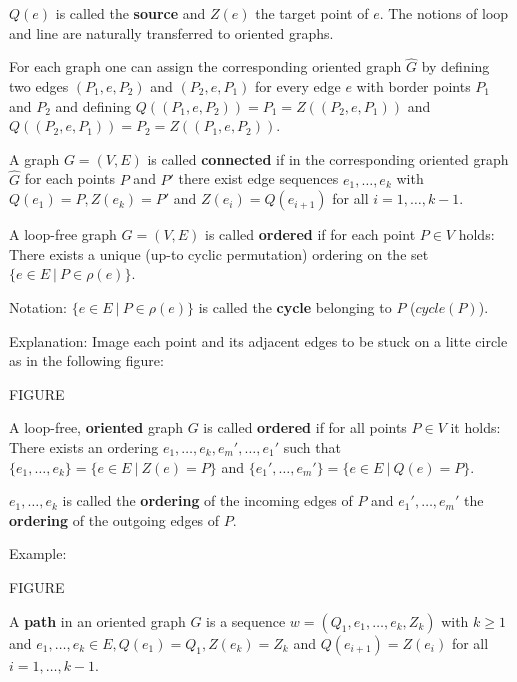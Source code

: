 $Q(e)$ is called the {\bf source} and $Z(e)$ the target point of $e$. The
notions of loop and line are naturally transferred to oriented graphs.

For each graph one can assign the corresponding oriented graph $\hat{G}$ by
defining two edges $(P_1,e,P_2)$ and $(P_2,e,P_1)$ for every edge $e$ with border points
$P_1$ and $P_2$ and defining $Q((P_1,e,P_2)) = P_1 = Z((P_2,e,P_1))$ and
$Q((P_2,e,P_1)) = P_2 = Z((P_1,e,P_2))$.

\begin{definition}
A graph $G = (V,E)$ is called {\bf connected} if in the corresponding oriented
graph $\hat{G}$ for each points $P$ and $P'$ there exist edge sequences $e_1,
\ldots, e_k$ with $Q(e_1) = P, Z(e_k) = P'$ and $Z(e_i) = Q(e_{i+1})$ for all
$i = 1, \ldots, k-1$.
\end{definition}

\begin{definition}
A loop-free graph $G = (V,E)$ is called {\bf ordered} if for each point $P \in
V$ holds: There exists a unique (up-to cyclic permutation) ordering on the set
$\{ e \in E \ |\ P \in \rho(e) \}$.
\end{definition}

Notation: $\{ e \in E \ |\ P \in \rho(e) \}$ is called the {\bf cycle} belonging
to $P$ ($cycle(P)$).

Explanation: Image each point and its adjacent edges to be stuck on a litte
circle as in the following figure:

FIGURE

\begin{definition}
A loop-free, {\bf oriented} graph $G$ is called {\bf ordered} if for all points
$P \in V$ it	holds: There exists an ordering $e_1, \ldots, e_k, e_m', \ldots,
e_1'$ such that $\{ e_1, \ldots, e_k \} = \{ e \in E\ |\ Z(e) = P \}$ and $\{
e_1', \ldots, e_m' \} = \{ e \in E\ |\ Q(e) = P \}$. 
\end{definition}

$e_1, \ldots, e_k$ is called the {\bf ordering} of the incoming edges of $P$ and
$e_1', \ldots, e_m'$ the {\bf ordering} of the outgoing edges of $P$.

Example:

FIGURE

\begin{definition}[path]
A {\bf path} in an oriented graph $G$ is a sequence $w = (Q_1, e_1, \ldots,
e_k, Z_k)$ with $k \geq 1$ and $e_1, \ldots, e_k \in E, Q(e_1) = Q_1,
Z(e_k)=Z_k$ and $Q(e_{i+1}) = Z(e_i)$ for all $i = 1, \ldots, k-1$.
\end{definition}

